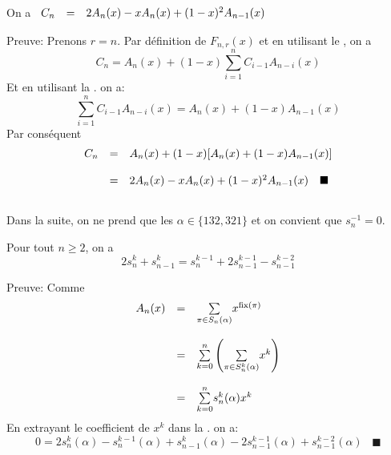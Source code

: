 \begin{proposition} \label{newCnExp} On a
	$
		\begin{array}{l l l}
			C_{n}%
			 & = & 2A_{n}(x)-xA_{n}(x)+(1-x)^{2}A_{n-1}(x)
		\end{array}
	$
\end{proposition}

Preuve:
Prenons $r = n$. Par définition de $F_{n, r}(x)$ et en utilisant le , on a
\[C_{n}=A_{n}(x)+(1-x)\underset{i=1}{\overset{n}{\sum}}C_{i-1}A_{n-i}(x) \]
Et en utilisant la . on a:
\[\underset{i=1}{\overset{n}{\sum}}C_{i-1}A_{n-i}(x) =A_{n}(x)+(1-x)A_{n-1}(x)\]
Par conséquent
\[
	\begin{array}{l l l}
		C_{n} & =       & A_{n}(x)+(1-x)[A_{n}(x)+(1-x)A_{n-1}(x)]                                       \\
		      & \text{} &                                                                                \\
		      & =       & 2A_{n}(x)-xA_{n}(x)+(1-x)^{2}A_{n-1}(x)\hspace{10pt}\blacksquare\vspace{ 15pt}
	\end{array}
\]
Dans la suite, on ne prend que les $\alpha\in\{132,321\}$ et on convient que $s_{n}^{-1}=0$.
\begin{proposition} \label{genFn} Pour tout $n\geq 2$, on a
	\[
		2s_{n}^{k}+s_{n-1}^{k}=s_{n}^{k-1}+2s_{n-1}^{k-1}-s_{n-1}^{k-2}
	\]
\end{proposition}
Preuve:
Comme
\[
	\begin{array}{l l  l}

		A_{n}(x) & =       & \underset{\pi\in S_{n}(\alpha)}{\sum}x^{\text{fix}(\pi)}                                            \\
		         & \text{} &                                                                                              \\
		         & =       & \underset{k=0}{\overset{n}{\sum}}\left(\underset{\pi\in S_{n}^{k}(\alpha)}{\sum}x^{k}\right) \\
		         & \text{} &                                                                                              \\
		         & =       & \underset{k=0}{\overset{n}{\sum}}s_{n}^{k}(\alpha)x^{k}
	\end{array}
\]
En extrayant le coefficient de $x^{k}$ dans la . on a:
\[ 0=2s_{n}^{k}(\alpha)-s_{n}^{k-1}(\alpha)+s_{n-1}^{k}(\alpha)-2s_{n-1}^{k-1}(\alpha)+s_{n-1}^{k-2}(\alpha)\hspace{10pt}\blacksquare \]

